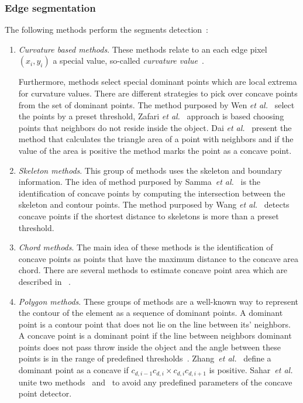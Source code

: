 \documentclass{lutmscthesis}[2010/09/22]
\begin{document}
\subsubsection{Edge segmentation}
The following methods perform the segments detection~\cite{compare-cpd}:
\begin{enumerate}
    \item 
    \textit{Curvature based methods}. 
    These methods relate to an each edge pixel $(x_i,y_i)$ a special value, so-called \textit{curvature value}~\cite{Zafari15}.
    
    
    Furthermore, methods select special dominant points which are local extrema for curvature values. There are different strategies to pick over concave points from the set of dominant points. The method purposed by Wen \emph{et al.}~\cite{curv-wen}  select the points by a preset threshold, Zafari \emph{et al.}~\cite{Zafari15} approach is based choosing points that neighbors do not reside inside the object. Dai \emph{et al.}~\cite{curv-dai} present the method that calculates the triangle area of a point with neighbors and if the value of the area is positive the method marks the point as a concave point.
   
    \item 
    \textit{Skeleton methods}. This group of methods uses the skeleton and boundary information. The idea of method purposed by Samma~\emph{et al.}~\cite{bnd-skeleton} is the identification of concave points by computing the intersection between the skeleton and contour points. The method purposed by Wang \emph{et al.}~\cite{skeleton} detects concave points if the shortest distance to skeletons is more than a preset threshold.
    \item 
    \textit{Chord methods}. The main idea of these methods is the identification of concave points as points that have the maximum distance to the concave area chord. There are several methods to estimate concave point area which are described in 
    ~\cite{chord-farhan,chord-kumar}.
    
    \item 
    \textit{Polygon methods}. These groups of methods are a well-known way to represent the contour of the element as a sequence of dominant points. A dominant point is a contour point that does not lie on the line between its' neighbors. A concave point is a dominant point if the line between neighbors dominant points does not pass throw inside the object and the angle between these points is in the range of predefined thresholds~\cite{Bai20092434}. Zhang~\emph{et al.}~\cite{bubble} define a dominant point as a concave if ${c_{d,i-1}c_{d,i}}\times {c_{d,i}c_{d,i+1}}$ is positive. Sahar~\emph{et al.}~\cite{compare-cpd} unite two methods~\cite{bubble} and~\cite{Bai20092434} to avoid any predefined parameters of the concave point detector.
\end{enumerate}
\end{document}
